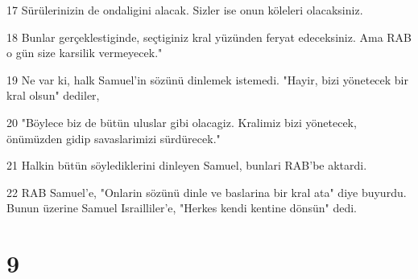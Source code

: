 \par 17 Sürülerinizin de ondaligini alacak. Sizler ise onun köleleri olacaksiniz.
\par 18 Bunlar gerçeklestiginde, seçtiginiz kral yüzünden feryat edeceksiniz. Ama RAB o gün size karsilik vermeyecek."
\par 19 Ne var ki, halk Samuel'in sözünü dinlemek istemedi. "Hayir, bizi yönetecek bir kral olsun" dediler,
\par 20 "Böylece biz de bütün uluslar gibi olacagiz. Kralimiz bizi yönetecek, önümüzden gidip savaslarimizi sürdürecek."
\par 21 Halkin bütün söylediklerini dinleyen Samuel, bunlari RAB'be aktardi.
\par 22 RAB Samuel'e, "Onlarin sözünü dinle ve baslarina bir kral ata" diye buyurdu. Bunun üzerine Samuel Israilliler'e, "Herkes kendi kentine dönsün" dedi.

\chapter{9}

